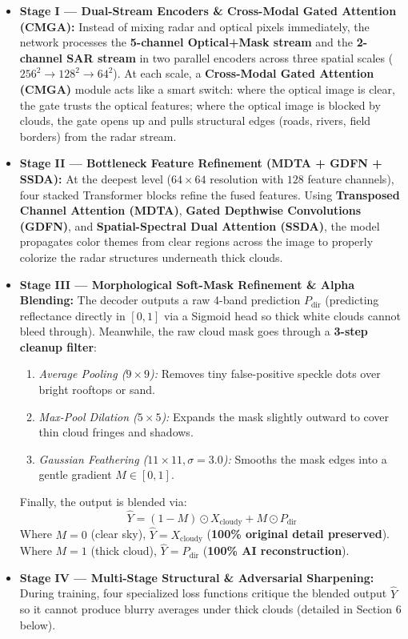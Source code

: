 \documentclass[11pt,a4paper]{article}
\begin{document}
\begin{itemize}[leftmargin=1.5em, itemsep=4pt]
    \item \textbf{Stage I --- Dual-Stream Encoders \& Cross-Modal Gated Attention (CMGA):}
    Instead of mixing radar and optical pixels immediately, the network processes the \textbf{5-channel Optical+Mask stream} and the \textbf{2-channel SAR stream} in two parallel encoders across three spatial scales ($256^2 \rightarrow 128^2 \rightarrow 64^2$). At each scale, a \textbf{Cross-Modal Gated Attention (CMGA)} module acts like a smart switch: where the optical image is clear, the gate trusts the optical features; where the optical image is blocked by clouds, the gate opens up and pulls structural edges (roads, rivers, field borders) from the radar stream.

    \item \textbf{Stage II --- Bottleneck Feature Refinement (MDTA + GDFN + SSDA):}
    At the deepest level ($64 \times 64$ resolution with $128$ feature channels), four stacked Transformer blocks refine the fused features. Using \textbf{Transposed Channel Attention (MDTA)}, \textbf{Gated Depthwise Convolutions (GDFN)}, and \textbf{Spatial-Spectral Dual Attention (SSDA)}, the model propagates color themes from clear regions across the image to properly colorize the radar structures underneath thick clouds.

    \item \textbf{Stage III --- Morphological Soft-Mask Refinement \& Alpha Blending:}
    The decoder outputs a raw 4-band prediction $P_{\text{dir}}$ (predicting reflectance directly in $[0,1]$ via a Sigmoid head so thick white clouds cannot bleed through). Meanwhile, the raw cloud mask goes through a \textbf{3-step cleanup filter}:
    \begin{enumerate}[leftmargin=1.5em, itemsep=1pt]
        \item \textit{Average Pooling ($9\times 9$):} Removes tiny false-positive speckle dots over bright rooftops or sand.
        \item \textit{Max-Pool Dilation ($5\times 5$):} Expands the mask slightly outward to cover thin cloud fringes and shadows.
        \item \textit{Gaussian Feathering ($11\times 11, \sigma=3.0$):} Smooths the mask edges into a gentle gradient $M \in [0,1]$.
    \end{enumerate}
    Finally, the output is blended via:
    \[
        \hat{Y} = (1 - M) \odot X_{\text{cloudy}} + M \odot P_{\text{dir}}
    \]
    Where $M=0$ (clear sky), $\hat{Y} = X_{\text{cloudy}}$ (\textbf{100\% original detail preserved}). Where $M=1$ (thick cloud), $\hat{Y} = P_{\text{dir}}$ (\textbf{100\% AI reconstruction}).

    \item \textbf{Stage IV --- Multi-Stage Structural \& Adversarial Sharpening:}
    During training, four specialized loss functions critique the blended output $\hat{Y}$ so it cannot produce blurry averages under thick clouds (detailed in Section 6 below).
\end{itemize}
\end{document}
